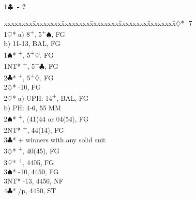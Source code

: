 \documentclass[10pt]{article}
\renewcommand{\c}{$\clubsuit$}
\renewcommand{\d}{$\diamondsuit$}
\newcommand{\h}{$\heartsuit$}
\newcommand{\s}{$\spadesuit$}
\newcommand{\p}{\textsuperscript{+}}
\newenvironment{bidtable}[1][]
{\textbf{#1}
  \begin{adjustwidth}{1em}{}
    \addvspace{2pt}
    \begin{tabbing}
      xxxxxxxx\=xxxxxxxx\=xxxxxxxx\=xxxxxxxx\=xxxxxxxx\=xxxxxxxx\=\kill}
{\end{tabbing}\end{adjustwidth}\bigskip}%
\begin{document}
\begin{multicols*}{2}

\begin{bidtable}[1\c\ - ?]
1\d* {}-7                            \\
1\h* \> a) 8\p , 5\p \s, FG            \\
     \> b) 11-13, BAL, FG              \\
1\s* {}\p, 5\p\h, FG                 \\
1NT* \p, 5\p\c, FG                 \\
2\c* {}\p, 5\p\d, FG                 \\
2\d* {}-10, FG                       \\
2\h* \> a) UPH: 14\p, BAL, FG          \\
     \> b) PH: 4-6, 55 MM              \\
2\s* {}\p, (41)44 or 04(54), FG      \\
2NT* \p, 44(14), FG                \\
3\c* {}+ winners with any solid suit \\
3\d* {}\p, 40(45), FG                    \\
3\h* {}\p, 4405, FG                      \\
3\s* {}-10, 4450, FG                     \\
3NT* -13, 4450, NF                    \\
4\c* {}/p, 4450, ST                     \\
\end{bidtable}


\end{multicols*}
\end{document}
